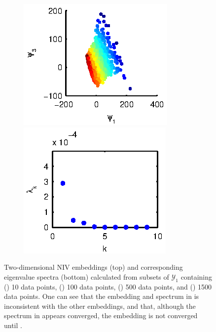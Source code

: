 \begin{figure}[t]
\begin{subfigure}{0.22\textwidth}
\includegraphics[width=\textwidth]{rxn_npoints_embed6}\\
\includegraphics[width=\textwidth]{rxn_npoints_spectrum6}
\caption{}
\label{subfig:rxn_convergence4}
\end{subfigure}
\caption[Convergence of intrinsic variable embeddings as a function of the number of data points]{Two-dimensional NIV embeddings (top) and corresponding eigenvalue spectra (bottom) calculated from subsets of $\mathcal{Y}_1$ containing () 10 data points, () 100 data points, () 500 data points, and () 1500 data points. One can see that the embedding and spectrum in  is inconsistent with the other embeddings, and that, although the spectrum in  appears converged, the embedding is not converged until . }
\label{fig:rxn_convergence}
\end{figure}

